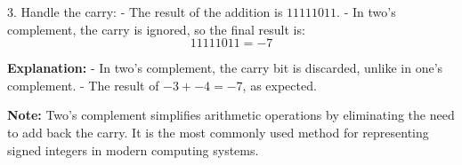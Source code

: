 \documentclass{report}
\begin{document}
3. Handle the carry:
   - The result of the addition is \(11111011\).
   - In two's complement, the carry is ignored, so the final result is:
     \[
     11111011 = -7
     \]

\textbf{Explanation:}
- In two's complement, the carry bit is discarded, unlike in one's complement.
- The result of \(-3 + -4 = -7\), as expected.

\begin{center}
\end{center}

\textbf{Note:} Two's complement simplifies arithmetic operations by eliminating the need to add back the carry. It is the most commonly used method for representing signed integers in modern computing systems.
\end{document}
